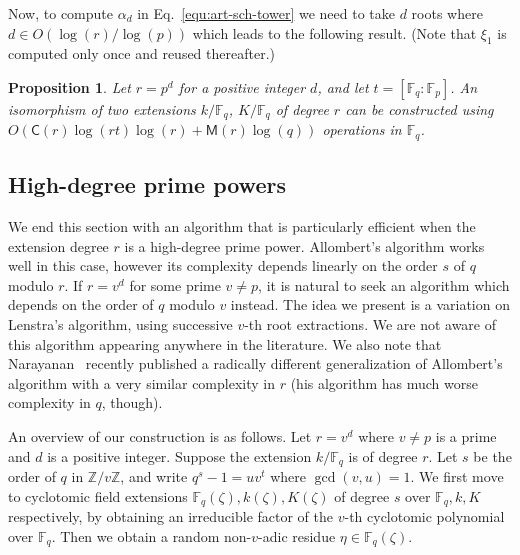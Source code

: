 \documentclass[12pt]{article}
\theoremstyle{plain}
\newtheorem{proposition}[theorem]{Proposition}
\theoremstyle{definition}
\def\Z{\ensuremath{\mathbb{Z}}}
\def\F{\ensuremath{\mathbb{F}}}
\def\MM{\ensuremath{\mathsf{M}}}
\def\CC{\ensuremath{\mathsf{C}}}
\newcounter{algorithm}
\begin{document}
Now, to compute $\alpha_d$ in Eq.~\eqref{equ:art-sch-tower} we 
need to take $d$ roots where $d \in O(\log(r) / \log(p))$ which leads to the following result. (Note that $\xi_1$ is computed only once and reused thereafter.)

\begin{proposition}
	Let $r = p^d$ for a positive integer $d$, and let $t = [\F_q : \F_p]$. An isomorphism of two 
	extensions $k / \F_q$, $K / \F_q$ of degree $r$ can be constructed using 
	$O(\CC(r)\log(rt)\log(r) + \MM(r)\log(q))$ operations in $\F_q$.
\end{proposition}


\subsection{High-degree prime powers}
\label{sec:fast-algor-large}

We end this section with an algorithm that is particularly efficient when the extension 
degree $r$ is a high-degree prime power.
Allombert's algorithm works well in this case, however its
complexity depends linearly on the order $s$ of $q$ modulo $r$. If $r=v^d$ for some prime $v\ne p$,
it is natural to seek an algorithm which depends on the order of $q$ modulo $v$ instead.
The idea we present is a variation on Lenstra's algorithm, using successive $v$-th root
extractions.
We are not aware of this algorithm appearing anywhere in the literature. %
We also note that Narayanan~\cite[Sec.~5]{narayanan2016fast} recently
published a radically different generalization
of Allombert's algorithm with a very similar complexity in $r$ (his
algorithm has much worse complexity in $q$, though).

An overview of our construction is as follows. Let $r = v^d$ where $v \ne p$ is a 
prime and $d$ is a positive integer. Suppose the extension $k/\F_q$ is of degree $r$. Let $s$ be 
the order of $q$ in $\Z / v\Z$, and write $q^s - 1 = uv^t$ where $\gcd(v, u) = 1$. We first move to 
cyclotomic field extensions $\F_q(\zeta), k(\zeta), K(\zeta)$ of degree $s$ over $\F_q, k, K$ respectively, by 
obtaining an irreducible factor of the $v$-th cyclotomic polynomial over $\F_q$. Then we obtain a  
random non-$v$-adic residue $\eta \in \F_q(\zeta)$.
\end{document}
